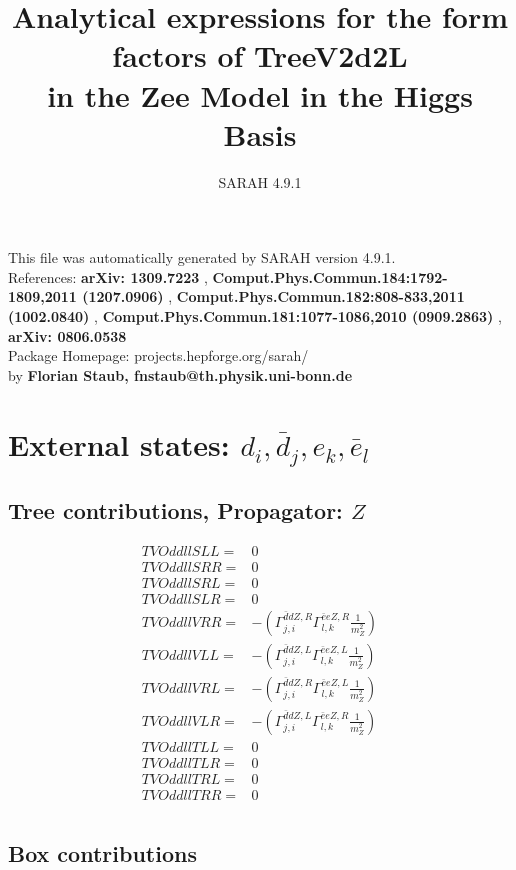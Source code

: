 \documentclass[A4,landscape]{article}
\begin{document}
\title{Analytical expressions for the form factors of TreeV2d2L\\ in the Zee Model in the Higgs Basis } 
 \author{SARAH 4.9.1} 
 \maketitle 
 \vspace{10cm} 
This file was automatically generated by SARAH version 4.9.1.  \\ 
References: {\bf arXiv: 1309.7223 }, {\bf Comput.Phys.Commun.184:1792-1809,2011 (1207.0906) }, {\bf Comput.Phys.Commun.182:808-833,2011 (1002.0840) }, {\bf Comput.Phys.Commun.181:1077-1086,2010 (0909.2863) }, {\bf arXiv: 0806.0538 } \\ 
Package Homepage: projects.hepforge.org/sarah/ \\ 
by {\bf Florian Staub, fnstaub@th.physik.uni-bonn.de} 
 \pagebreak 
 \tableofcontents 
 \pagebreak 
\section{External states: ${d_{{i}}, \bar{d}_{{j}}, e_{{k}}, \bar{e}_{{l}}}$} 
\subsection{Tree contributions, Propagator: $Z$} 

\begin{align} 
  TVOddllSLL= & 0 \\ 
  TVOddllSRR= & 0 \\ 
  TVOddllSRL= & 0 \\ 
  TVOddllSLR= & 0 \\ 
  TVOddllVRR= & -(\Gamma^{\bar{d}d Z ,R}_{j, i} \Gamma^{\bar{e}e Z ,R}_{l, k} \frac{1}{m^2_{Z}}) \\ 
  TVOddllVLL= & -(\Gamma^{\bar{d}d Z ,L}_{j, i} \Gamma^{\bar{e}e Z ,L}_{l, k} \frac{1}{m^2_{Z}}) \\ 
  TVOddllVRL= & -(\Gamma^{\bar{d}d Z ,R}_{j, i} \Gamma^{\bar{e}e Z ,L}_{l, k} \frac{1}{m^2_{Z}}) \\ 
  TVOddllVLR= & -(\Gamma^{\bar{d}d Z ,L}_{j, i} \Gamma^{\bar{e}e Z ,R}_{l, k} \frac{1}{m^2_{Z}}) \\ 
  TVOddllTLL= & 0 \\ 
  TVOddllTLR= & 0 \\ 
  TVOddllTRL= & 0 \\ 
  TVOddllTRR= & 0 \\ 
\end{align} 
\subsection{Box contributions} 
\end{document}

